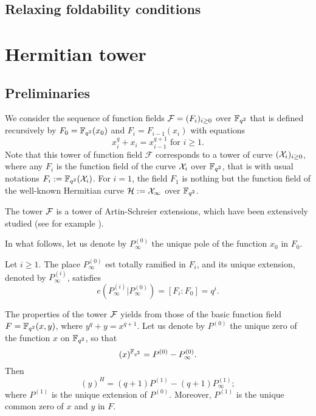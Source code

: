 \documentclass[10pt]{article}
\begin{document}
\subsection{Relaxing foldability conditions}



\section{Hermitian tower}

\subsection{Preliminaries}

We consider the sequence of function fields $\mathcal{F}=(F_i)_{i\geq 0}$ over $\mathbb{F}_{q^2}$ that is defined recursively by $F_0=\mathbb{F}_{q^2}(x_0)$ and $F_i = F_{i-1}(x_i)$ with equations
\[x_i^q+x_{i} = x_{i-1}^{q+1} \text{ for } i\geq 1.\]
Note that this tower of function field $\mathcal{F}$ corresponds to a tower of curve
$(\mathcal{X}_i)_{i\geq 0}$, where any $F_i$ is the function field of the curve $\mathcal{X}_i$ over $\mathbb{F}_{q^2}$, that is with usual notations $F_i := \mathbb{F}_{q^2}(\mathcal{X}_i)$. 
For $i=1$, the field $F_1$ is nothing but the function field of the well-known Hermitian curve $\mathcal{H}:= \cal{X}_1$ over $\mathbb{F}_{q^2}$.

The tower $\cal{F}$ is a tower of Artin-Schreier extensions, which have been extensively studied (see for example \cite{S08}). 

In what follows, let us denote by $P_{\infty}^{(0)}$ the unique pole of the function $x_0$ in $F_0$.

\begin{lemma}\cite[Proposition 3.7.8]{S08}
	Let $i \geq 1$. The place $P_{\infty}^{(0)}$ est totally ramified in $F_i$, and its unique extension, denoted by $P_{\infty}^{(i)}$, satisfies
\[e\left(P_{\infty}^{(i)}|P_{\infty}^{(0)}\right) = [F_i:F_0]=q^i.\]
\end{lemma}


The properties of the tower $\mathcal{F}$ yields from those of the basic function field $F=\mathbb{F}_{q^2}(x,y)$, where $y^q+y=x^{q+1}$. Let us denote by $P^{(0)}$ the unique zero of the function $x$ on $\mathbb{F}_{q^2}$, so that
\[(x)^{\mathbb{F}_{q^2}} = P^{(0)} - P^{(0)}_{\infty}.\]
Then
\[(y)^H = (q+1)P^{(1)} - (q+1)P^{(1)}_{\infty};\]
where $P^{(1)}$ is the unique extension of $P^{(0)}$. Moreover, $P^{(1)}$ is the unique common zero of $x$ and $y$ in $F$.
\end{document}
